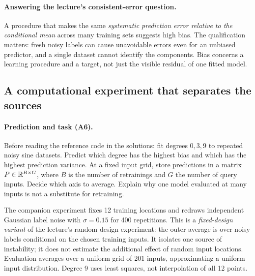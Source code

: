 \paragraph{Answering the lecture's consistent-error question.} A procedure that makes the same \emph{systematic prediction error relative to the conditional mean} across many training sets suggests high bias. The qualification matters: fresh noisy labels can cause unavoidable errors even for an unbiased predictor, and a single dataset cannot identify the components. Bias concerns a learning procedure and a target, not just the visible residual of one fitted model.

\subsection{A computational experiment that separates the sources}
\label{sec:reg:experiment}
\paragraph{Prediction and task (A6).} Before reading the reference code in the solutions: fit degrees $0,3,9$ to repeated noisy sine datasets. Predict which degree has the highest bias and which has the highest prediction variance. At a fixed input grid, store predictions in a matrix $P\in\mathbb{R}^{B\times G}$, where $B$ is the number of retrainings and $G$ the number of query inputs. Decide which axis to average. Explain why one model evaluated at many inputs is not a substitute for retraining.

The companion experiment fixes 12 training locations and redraws independent Gaussian label noise with $\sigma=0.15$ for 400 repetitions. This is a \emph{fixed-design variant} of the lecture's random-design experiment: the outer average is over noisy labels conditional on the chosen training inputs. It isolates one source of instability; it does not estimate the additional effect of random input locations. Evaluation averages over a uniform grid of 201 inputs, approximating a uniform input distribution. Degree 9 uses least squares, not interpolation of all 12 points.

